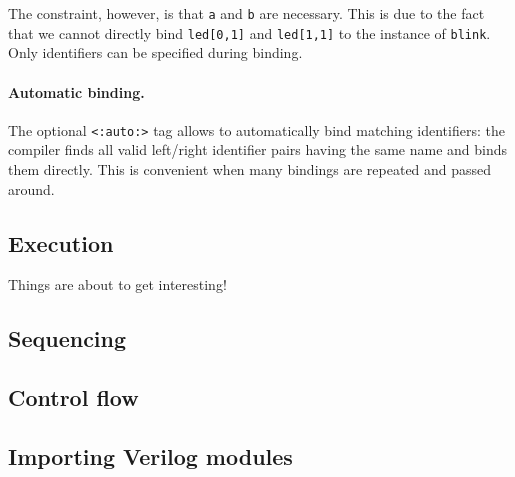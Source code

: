 \documentclass[a4]{article}
\newcommand\verilog{Verilog}
\begin{document}
The constraint, however, is that \texttt{a} and \texttt{b} are necessary. This is due to the fact that we cannot directly bind \texttt{led[0,1]} and \texttt{led[1,1]} to the instance of \texttt{blink}. Only identifiers can be specified during binding.

\paragraph{Automatic binding.}
The optional \texttt{<:auto:>} tag allows to automatically bind matching identifiers:
the compiler finds all valid left/right identifier pairs having the same name and
binds them directly. This is convenient when many bindings are repeated and passed
around. 


\subsection{Execution}

Things are about to get interesting! 



%
%
%
%
% 


\subsection{Sequencing}



\subsection{Control flow}




\subsection{Importing \verilog{} modules}
\end{document}

